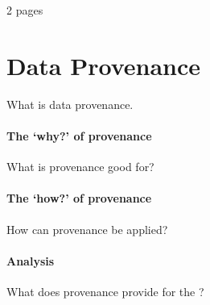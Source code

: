\newline

2 pages

\section{Data Provenance}
What is data provenance.
\paragraph{The `why?' of provenance}
What is provenance good for?
\paragraph{The `how?' of provenance}
How can provenance be applied?
\paragraph{Analysis}
What does provenance provide for the \ivfsystem?